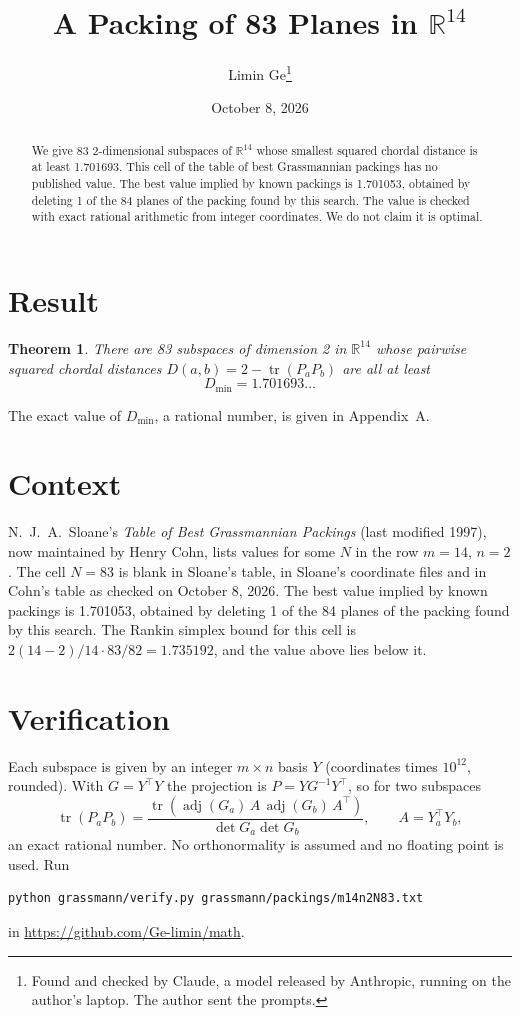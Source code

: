 \documentclass[11pt,a4paper]{article}
\title{A Packing of 83 Planes in $\mathbb{R}^{14}$}
\author{Limin Ge\thanks{Found and checked by Claude, a model released by Anthropic, running on the author's laptop. The author sent the prompts.}}
\date{October 8, 2026}
\newtheorem*{theorem}{Theorem}
\begin{document}
\maketitle
\begin{abstract}
We give 83 2-dimensional subspaces of $\mathbb{R}^{14}$ whose smallest squared chordal distance is at least 1.701693. This cell of the table of best Grassmannian packings has no published value. The best value implied by known packings is 1.701053, obtained by deleting 1 of the 84 planes of the packing found by this search. The value is checked with exact rational arithmetic from integer coordinates. We do not claim it is optimal.
\end{abstract}

\section{Result}
\begin{theorem}
There are 83 subspaces of dimension 2 in $\mathbb{R}^{14}$ whose pairwise squared chordal distances $D(a,b) = 2 - \operatorname{tr}(P_aP_b)$ are all at least
\[ D_{\min} = 1.701693\ldots \]
\end{theorem}
The exact value of $D_{\min}$, a rational number, is given in Appendix~A.


\section{Context}
N.~J.~A.~Sloane's \emph{Table of Best Grassmannian Packings} (last modified 1997), now maintained by Henry Cohn, lists values for some $N$ in the row $m=14$, $n=2$. The cell $N=83$ is blank in Sloane's table, in Sloane's coordinate files and in Cohn's table as checked on October 8, 2026. The best value implied by known packings is 1.701053, obtained by deleting 1 of the 84 planes of the packing found by this search. The Rankin simplex bound for this cell is $2(14-2)/14\cdot 83/82 = 1.735192$, and the value above lies below it.


\section{Verification}
Each subspace is given by an integer $m\times n$ basis $Y$ (coordinates times $10^{12}$, rounded). With $G=Y^\top Y$ the projection is $P=YG^{-1}Y^\top$, so for two subspaces
\[ \operatorname{tr}(P_aP_b)=\frac{\operatorname{tr}(\operatorname{adj}(G_a)\,A\,\operatorname{adj}(G_b)\,A^\top)}{\det G_a\det G_b},\qquad A=Y_a^\top Y_b, \]
an exact rational number. No orthonormality is assumed and no floating point is used. Run
\begin{verbatim}
python grassmann/verify.py grassmann/packings/m14n2N83.txt
\end{verbatim}
in \url{https://github.com/Ge-limin/math}.
\end{document}
